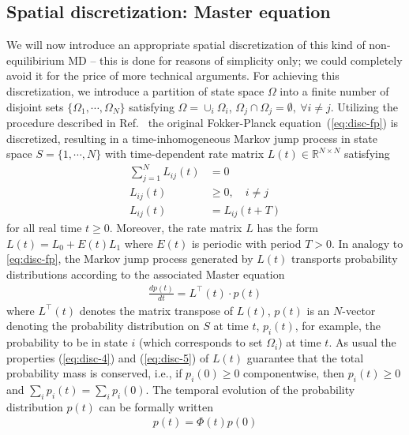 \documentclass[aps, pre, preprint,unsortedaddress,a4paper,onecolumn]{revtex4}
\newcommand{\vect}[1]{#1}
\newcommand{\myphi}{\Phi}
\begin{document}
\subsection{Spatial discretization: Master equation}
We will now introduce an appropriate spatial discretization of this kind of non-equilibirium MD -- this is done for reasons of simplicity only; we could completely avoid it for the price of more technical arguments.
For achieving this discretization, we 
introduce a partition of state space $\Omega$ into a finite number of disjoint
sets $\{ \Omega_1, \cdots, \Omega_N\}$ satisfying $\Omega = \cup_i \Omega_i$,
$\Omega_j\cap \Omega_j = \emptyset,\ \forall i\neq j$.
Utilizing the procedure described in Ref.~\cite{latorre2011structure} the original Fokker-Planck equation~(\ref{eq:disc-fp})
is discretized, resulting in a time-inhomogeneous Markov jump process in state
space $S = \{1, \cdots, N\}$ with time-dependent rate
matrix $\vect L(t) \in \mathbb R^{N\times N}$ satisfying
\begin{align}\label{eq:disc-4}
\sum\limits_{j=1}^N L_{ij}(t) & =  0\\ \label{eq:disc-5}
L_{ij}(t) & \ge  0, \quad i\not= j\\
L_{ij}(t) & =  L_{ij}(t+T)
\end{align}
for all real time $t\geq 0$.
Moreover, the rate matrix $L$ has the form $\vect L(t)=\vect L_0+E(t)\vect L_1$
where $E(t)$ is periodic with period $T>0$.
In analogy to \eqref{eq:disc-fp}, the Markov jump process generated by
$\vect L(t)$ transports probability distributions according to the associated Master equation
\begin{align}
  \label{eq:disc-master}
  \frac{d\vect p(t)}{dt} = \vect L^{\top}(t)\cdot \vect p(t)
\end{align}
where $\vect L^{\top}(t)$ denotes the matrix transpose of $\vect L(t)$, $\vect p(t)$ is an $N$-vector denoting the probability distribution on $S$ at time $t$, $p_i(t)$, for example, the probability to be in state $i$ (which corresponds to set $\Omega_i$) at time $t$.
As usual the properties (\ref{eq:disc-4}) and (\ref{eq:disc-5}) of
$\vect L(t)$ guarantee that the total probability mass is conserved,
i.e., if $p_i(0)\ge 0$ componentwise, then $p_i(t)\ge 0$ and $\sum_i
p_i(t) = \sum_ip_i(0)$.
The temporal evolution of the probability distribution $\vect p(t)$ can be formally written
\begin{align}  \label{eq:disc-8}
\vect p(t)=\myphi(t)\vect p(0)
\end{align}
\end{document}
